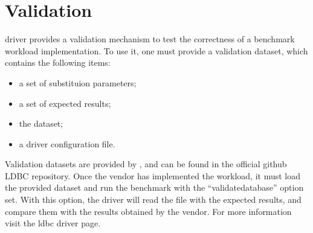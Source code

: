 \section{Validation}

\ldbcsnb driver provides a validation mechanism to test the correctness of a benchmark 
workload implementation. To use it, one must provide a validation dataset, which contains
the following items:
\begin{itemize}
    \item a set of substituion parameters;
    \item a set of expected results;
    \item the dataset;
    \item a driver configuration file.
\end{itemize}

Validation datasets are provided by \ldbcsnb, and can be found in the official github 
LDBC repository. 
Once the vendor has implemented the workload, it must load the provided dataset and run
the benchmark with the ``validatedatabase'' option set. With this option, the
driver will read the file with the expected results, and compare them with the results
obtained by the vendor. For more information visit the ldbc driver page.
